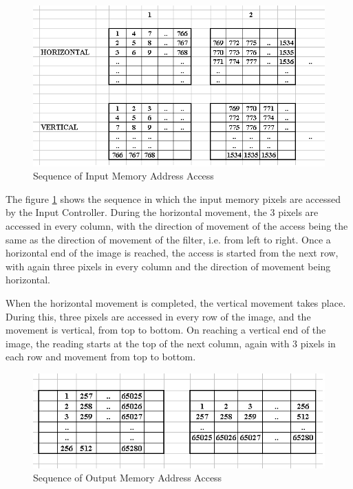 \documentclass[11pt,a4paper]{article}
\begin{document}
\begin{figure}[h]
	\centering
		\includegraphics[width=5in]{./images/memoryAccess.PNG}
	\caption{Sequence of Input Memory Address Access}	
	\label{fig:memaccess}
\end{figure}

\FloatBarrier

The figure \ref{fig:memaccess} shows the sequence in which the input memory pixels are accessed by the Input Controller. During the horizontal movement, the 3 pixels are accessed in every column, with the direction of movement of the access being the same as the direction of movement of the filter, i.e. from left to right. Once a horizontal end of the image is reached, the access is started from the next row, with again three pixels in every column and the direction of movement being horizontal. 

When the horizontal movement is completed, the vertical movement takes place. During this, three pixels are accessed in every row of the image, and the movement is vertical, from top to bottom. On reaching a vertical end of the image, the reading starts at the top of the next column, again with 3 pixels in each row and movement from top to bottom.

\begin{figure}[h]
	\centering
		\includegraphics[width=5in]{./images/outmemoryaccess.jpg}
	\caption{Sequence of Output Memory Address Access}	
	\label{fig:outmemaccess}
\end{figure}
\FloatBarrier
\end{document}
